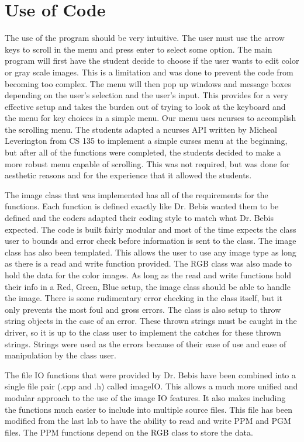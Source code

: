 \documentclass[pdftex, 11pt]{article}
\begin{document}
\section{Use of Code}

The use of the program should be very intuitive. The user must use the arrow keys to scroll in the menu and press enter
to select some option. The main program will first have the student decide to choose if the user wants to edit color or
gray scale images. This is a limitation and was done to prevent the code from becoming too complex. The menu will then
pop up windows and message boxes depending on the user's selection and the user's input. This provides for a very
effective setup and takes the burden out of trying to look at the keyboard and the menu for key choices in a simple
menu. Our menu uses ncurses to accomplish the scrolling menu. The students adapted a ncurses API written by Micheal
Leverington from CS 135 to implement a simple curses menu at the beginning, but after all of the functions were
completed, the students decided to make a more robust menu capable of scrolling. This was not required, but was done for
aesthetic reasons and for the experience that it allowed the students.

The image class that was implemented has all of the requirements for the functions. Each function is defined exactly
like Dr. Bebis wanted them to be defined and the coders adapted their coding style to match what Dr. Bebis expected. The
code is built fairly modular and most of the time expects the class user to bounds and error check before information is
sent to the class. The image class has also been templated. This allows the user to use any image type as long as there
is a read and write function provided. The RGB class was also made to hold the data for the color images. As long as the
read and write functions hold their info in a Red, Green, Blue setup, the image class should be able to handle the
image. There is some rudimentary error checking in the class itself, but it only prevents the most foul and
gross errors. The class is also setup to throw string objects in the case of an error. These thrown strings must be
caught in the driver, so it is up to the class user to implement the catches for these thrown strings. Strings were used
as the errors because of their ease of use and ease of manipulation by the class user. 

The file IO functions that were provided by Dr. Bebis have been combined into a single file pair (.cpp and .h) called
imageIO. This allows a much more unified and modular approach to the use of the image IO features. It also makes
including the functions much easier to include into multiple source files. This file has been modified from the last lab
to have the ability to read and write PPM and PGM files. The PPM functions depend on the RGB class to store the data.
\end{document}
